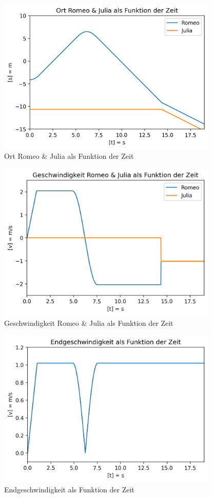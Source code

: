 \documentclass[../main.tex]{subfiles}
\begin{document}
    \begin{figure}[H]
        \begin{center}
            \centerline{\includegraphics[width=105mm]{./images/Inelastisch/OrtRomeoJuliaAlsFunktionDerZeit}}
            \caption{Ort Romeo \& Julia als Funktion der Zeit}
            \label{fig:OrtRomeoJuliaAlsFunktionDerZeit}
        \end{center}
    \end{figure}

    \begin{figure}[H]
        \begin{center}
            \centerline{\includegraphics[width=105mm]{./images/Inelastisch/GeschwindigkeitRomeoJulia}}
            \caption{Geschwindigkeit Romeo \& Julia als Funktion der Zeit}
            \label{fig:GeschwindigkeitRomeoJulia}
        \end{center}
    \end{figure}

    \begin{figure}[H]
        \begin{center}
            \centerline{\includegraphics[width=105mm]{./images/Inelastisch/Endgeschwindigkeit}}
            \caption{Endgeschwindigkeit als Funktion der Zeit}
            \label{fig:Endgeschwindigkeit}
        \end{center}
    \end{figure}
\end{document}

